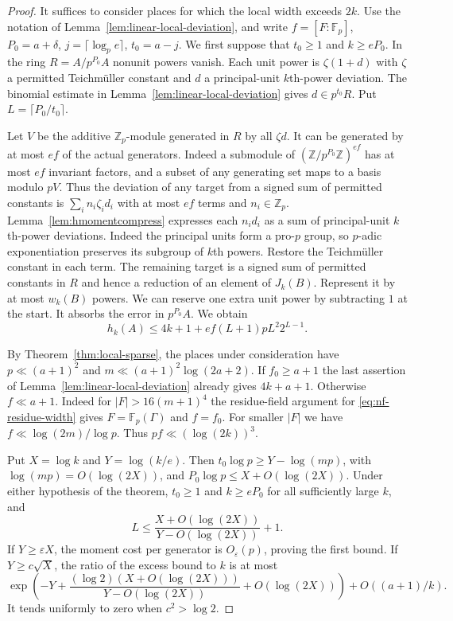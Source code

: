 \documentclass[11pt,letterpaper]{article}
\theoremstyle{definition}
\numberwithin{equation}{section}
\begin{document}
\begin{proof}
It suffices to consider places for which the local width exceeds
$2k$. Use the notation of Lemma~\ref{lem:linear-local-deviation},
and write $f=[F:\mathbb F_p]$, $P_0=a+\delta$,
$j=\lceil\log_p e\rceil$, $t_0=a-j$. We first suppose that
$t_0\ge1$ and $k\ge eP_0$. In the ring $R=A/p^{P_0} A$ nonunit
powers vanish. Each unit power is $\zeta(1+d)$ with $\zeta$ a permitted
Teichm\"uller constant and $d$ a principal-unit $k$th-power deviation.
The binomial estimate in Lemma~\ref{lem:linear-local-deviation}
gives $d\in p^{t_0}R$. Put $L=\lceil P_0/t_0\rceil$.

Let $V$ be the additive $\mathbb Z_p$-module generated in $R$ by all
$\zeta d$. It can be generated by at most $ef$ of the actual
generators. Indeed a submodule of
$(\mathbb Z/p^{P_0}\mathbb Z)^{ef}$ has at most $ef$ invariant
factors, and a subset of any generating set maps to a basis modulo
$pV$. Thus the deviation of any target from a signed sum of permitted
constants is $\sum_i n_i\zeta_i d_i$ with at most $ef$ terms and
$n_i\in\mathbb Z_p$. Lemma~\ref{lem:hmomentcompress} expresses
each $n_id_i$ as a sum of principal-unit $k$th-power deviations.
Indeed the principal units form a pro-$p$ group, so $p$-adic
exponentiation preserves its subgroup of $k$th powers. Restore
the Teichm\"uller constant in each term. The remaining target is a
signed sum of permitted constants in $R$ and hence a reduction of
an element of $J_k(B)$. Represent it by at most $w_k(B)$ powers.
We can reserve one extra unit power by subtracting $1$ at the start.
It absorbs the error in $p^{P_0}A$. We obtain
\[
       h_k(A)\le 4k+1+ef(L+1)pL^2 2^{L-1}.
\]

By Theorem~\ref{thm:local-sparse}, the places under consideration
have $p\ll(a+1)^2$ and $m\ll(a+1)^2\log(2a+2)$.
If $f_0\ge a+1$ the last assertion of
Lemma~\ref{lem:linear-local-deviation} already gives $4k+a+1$.
Otherwise $f\ll a+1$. Indeed for $|F|>16(m+1)^4$
the residue-field argument for \eqref{eq:nf-residue-width}
gives $F=\mathbb F_p(\Gamma)$ and $f=f_0$. For smaller $|F|$ we have
$f\ll\log(2m)/\log p$. Thus $pf\ll(\log(2k))^3$.

Put $X=\log k$ and $Y=\log(k/e)$. Then
$t_0\log p\ge Y-\log(mp)$, with $\log(mp)=O(\log(2X))$, and
$P_0\log p\le X+O(\log(2X))$. Under either hypothesis of the
theorem, $t_0\ge1$ and $k\ge eP_0$ for all sufficiently large $k$,
and
\[
                L\le\frac{X+O(\log(2X))}{Y-O(\log(2X))}+1 .
\]
If $Y\ge\varepsilon X$, the moment cost per generator is
$O_\varepsilon(p)$, proving the first bound. If $Y\ge c\sqrt X$,
the ratio of the excess bound to $k$ is at most
\[
    \exp\!\left( -Y+
       \frac{(\log2)(X+O(\log(2X)))}{Y-O(\log(2X))}
           +O(\log(2X))\right)+O((a+1)/k).
\]
It tends uniformly to zero when $c^2>\log2$.
\end{proof}
\end{document}
